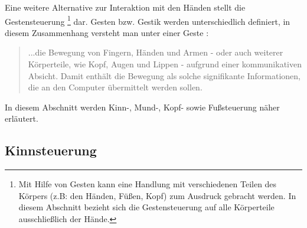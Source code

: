 Eine weitere Alternative zur Interaktion mit den Händen stellt die Gestensteuerung%
\footnote{Mit Hilfe von Gesten kann eine Handlung mit verschiedenen Teilen des Körpers (z.B: den Händen, Füßen, Kopf) zum Ausdruck gebracht werden. In diesem Abschnitt bezieht sich die Gestensteuerung auf alle Körperteile ausschließlich der Hände.} %
dar. Gesten bzw. Gestik werden unterschiedlich definiert, in diesem Zusammenhang versteht man unter einer Geste \cite{PreimDachselt}:
\begin{quote} ...die Bewegung von Fingern, Händen und Armen - oder auch weiterer Körperteile, wie Kopf, Augen und Lippen - aufgrund einer kommunikativen Absicht. Damit enthält die Bewegung als solche signifikante Informationen, die an den Computer übermittelt werden sollen. \end{quote}
In diesem Abschnitt werden Kinn-, Mund-, Kopf- sowie Fußsteuerung näher erläutert. 
%
%
\subsection{Kinnsteuerung}
\label{cha:Kinnsteuerung}

